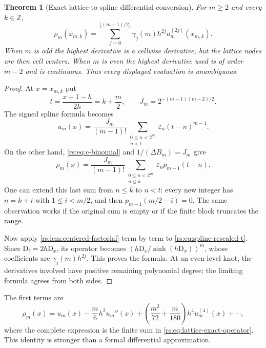 \documentclass[11pt,a4paper,oneside,openany]{book}
\numberwithin{equation}{chapter}
\newtheorem{theorem}{Theorem}[chapter]
\theoremstyle{definition}
\theoremstyle{remark}
\newcommand{\eps}{\varepsilon}
\newcommand{\Z}{\mathbb Z}
\newcommand{\D}{\mathrm D}
\begin{document}
\begin{theorem}[Exact lattice-to-spline differential conversion]\label{rs:thm:lattice-operator}
For $m\geq2$ and every $k\in\Z$,
\begin{equation}
 \boxed{\quad
 \rho_m(x_{m,k})=
 \sum_{j=0}^{\lfloor(m-1)/2\rfloor}
        \gamma_j(m)h^{2j}u_m^{(2j)}(x_{m,k}).\quad}
 \label{rs:eq:lattice-exact-operator}
\end{equation}
When $m$ is odd the highest derivative is a cellwise derivative,
but the lattice nodes are then cell centers. When $m$ is even the
highest derivative used is of order $m-2$ and is continuous.
Thus every displayed evaluation is unambiguous.
\end{theorem}
\begin{proof}
At $x=x_{m,k}$ put
\begin{equation}
 t=\frac{x+1-h}{2h}=k+\frac m2,
 \qquad J_m=2^{-(m-1)(m-2)/2}.
\end{equation}
The signed spline formula becomes
\begin{equation}
 u_m(x)=\frac{J_m}{(m-1)!}
       \sum_{\substack{0\leq n<2^m\\n<t}}\eps_n(t-n)^{m-1}.
 \label{rs:eq:spline-rescaled-t}
\end{equation}
On the other hand, \eqref{rs:eq:c-binomial} and
$1/(\Delta B_m)=J_m$ give
\begin{equation}
 \rho_m(x)=\frac{J_m}{(m-1)!}
       \sum_{\substack{0\leq n<2^m\\n\leq k}}\eps_n p_{m-1}(t-n).
 \label{rs:eq:rho-rescaled-t}
\end{equation}
One can extend this last sum from $n\leq k$ to $n<t$: every new
integer has $n=k+i$ with $1\leq i<m/2$, and then
$p_{m-1}(m/2-i)=0$. The same observation works if the original
sum is empty or if the finite block truncates the range.

Now apply \cref{rs:lem:centered-factorial} term by term to
\eqref{rs:eq:spline-rescaled-t}. Since $\D_t=2h\D_x$, its operator
becomes $(h\D_x/\sinh(h\D_x))^m$, whose coefficients are
$\gamma_j(m)h^{2j}$. This proves the formula. At an even-level
knot, the derivatives involved have positive remaining polynomial
degree; the limiting formula agrees from both sides.
\end{proof}

The first terms are
\begin{equation}
 \rho_m(x)=u_m(x)-\frac m6h^2u_m''(x)
        +\left(\frac{m^2}{72}+\frac m{180}\right)h^4u_m^{(4)}(x)
        +\cdots,
 \label{rs:eq:operator-first}
\end{equation}
where the complete expression is the finite sum in
\eqref{rs:eq:lattice-exact-operator}. This identity is stronger than a
formal differential approximation.
\end{document}

